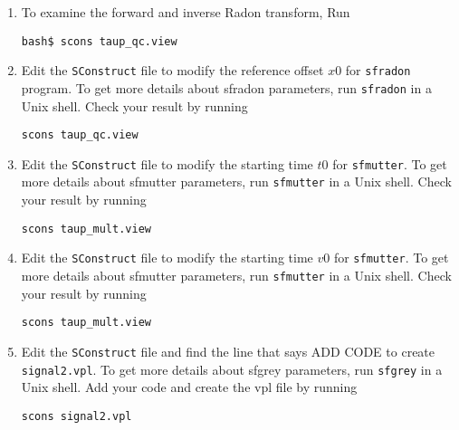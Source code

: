 \begin{enumerate}
\item To examine the forward and inverse Radon transform, Run
\begin{verbatim}
bash$ scons taup_qc.view
\end{verbatim}




\item Edit the \texttt{SConstruct} file to modify the reference offset $x0$ for \texttt{sfradon} program. To get more details about sfradon parameters, run \texttt{sfradon} in a Unix shell. Check your result by running
\begin{verbatim}
scons taup_qc.view
\end{verbatim}

\item Edit the \texttt{SConstruct} file to modify the starting time $t0$ for \texttt{sfmutter}. To get more details about sfmutter parameters, run \texttt{sfmutter} in a Unix shell. Check your result by running
\begin{verbatim}
scons taup_mult.view
\end{verbatim}

\item Edit the \texttt{SConstruct} file to modify the starting time $v0$ for \texttt{sfmutter}. To get more details about sfmutter parameters, run \texttt{sfmutter} in a Unix shell. Check your result by running
\begin{verbatim}
scons taup_mult.view
\end{verbatim}

\item Edit the \texttt{SConstruct} file and find the line that says ADD CODE to create \texttt{signal2.vpl}. To get more details about sfgrey parameters, run \texttt{sfgrey} in a Unix shell. Add your code and create the vpl file by running
\begin{verbatim}
scons signal2.vpl
\end{verbatim}


\end{enumerate}
